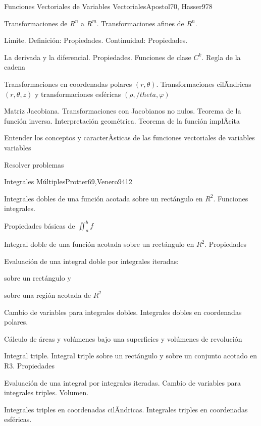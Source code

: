 \begin{syllabus}
\begin{unit}{Funciones Vectoriales de Variables Vectoriales}{Apostol70, Hasser97}{8}
   \begin{topics}
         \item  Transformaciones de $R^n$ a $R^m$. Transformaciones afines de $R^n$.
	 \item  Limite. Definición: Propiedades. Continuidad: Propiedades.
         \item  La derivada y la diferencial. Propiedades. Funciones de clase $C^k$. Regla de la cadena
	 \item  Transformaciones en coordenadas polares $(r,\theta)$. Transformaciones cilÃ­ndricas  $(r,\theta,z)$ y transformaciones esféricas $(\rho,/theta,\varphi)$
         \item  Matriz Jacobiana. Transformaciones con Jacobianos no nulos. Teorema de la función inversa. Interpretación geométrica. Teorema de la función implÃ­cita
   \end{topics}

   \begin{unitgoals}
         \item  Entender los conceptos y caracterÃ­sticas de las funciones vectoriales de variables variables
         \item  Resolver problemas
   \end{unitgoals}
\end{unit}

\begin{unit}{Integrales Múltiples}{Protter69,Venero94}{12}
   \begin{topics}
         \item  Integrales dobles de una función acotada sobre un rectángulo en $R^2$. Funciones integrales.
	 \item  Propiedades básicas de $\iint_{a}^{b} f$
         \item  Integral doble de una función acotada sobre un rectángulo en $R^2$. Propiedades
	 \item  Evaluación de una integral doble por integrales iteradas:
	\begin{subtopicos}
		\item sobre un rectángulo y
		\item sobre una región acotada de $R^2$
	\end{subtopicos}
         \item  Cambio de variables para integrales dobles. Integrales dobles en coordenadas polares.
	 \item  Cálculo de áreas y volúmenes bajo una superficies y volúmenes de revolución
         \item  Integral triple. Integral triple sobre un rectángulo y sobre un conjunto acotado en R3. Propiedades
	\item Evaluación de una integral por integrales iteradas. Cambio de variables para integrales triples. Volumen.
	\item Integrales triples en coordenadas cilÃ­ndricas. Integrales triples en coordenadas esféricas.
   \end{topics}


\end{unit}
\end{syllabus}
